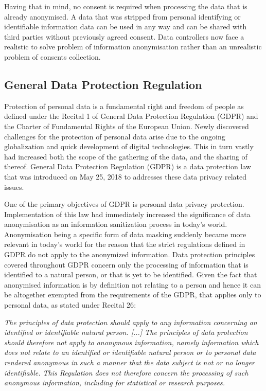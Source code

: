 \documentclass[a4paper,twoside,12pt]{book}
\begin{document}
Having that in mind, no consent is required when processing the data that is already anonymised. A data that was stripped from personal identifying or identifiable information data can be used in any way and can be shared with third parties without previously agreed consent. Data controllers now face a realistic to solve problem of information anonymisation rather than an unrealistic problem of consents collection.\cite{bib:anonymizing_health_data}

\subsection{General Data Protection Regulation}

Protection of personal data is a fundamental right and freedom of people as defined under the Recital 1 of General Data Protection Regulation (GDPR) and the Charter of Fundamental Rights of the European Union.\cite{bib:recital1}\cite{bib:charter} Newly discovered challenges for the protection of personal data arise due to the ongoing globalization and quick development of digital technologies. This in turn vastly had increased both the scope of the gathering of the data, and the sharing of thereof. General Data Protection Regulation (GDPR) is a data protection law that was introduced on May 25, 2018 to addresses these data privacy related issues.\cite{bib:recital6}

One of the primary objectives of GDPR is personal data privacy protection. Implementation of this law had immediately increased the significance of data anonymisation as an information sanitization process in today's world.\cite{bib:anonymization_for_research} Anonymisation being a specific form of data masking suddenly became more relevant in today's world for the reason that the strict regulations defined in GDPR do not apply to the anonymized information. Data protection principles covered throughout GDPR concern only the processing of information that is identified to a natural person, or that is yet to be identified. Given the fact that anonymised information is by definition not relating to a person and hence it can be altogether exempted from the requirements of the GDPR, that applies only to personal data, as stated under Recital 26\cite{bib:recital26}:

\begin{displayquote}
	\textit{The principles of data protection should apply to any information concerning an identified or identifiable natural person. [...] The principles of data protection should therefore not apply to anonymous information, namely information which does not relate to an identified or identifiable natural person or to personal data rendered anonymous in such a manner that the data subject is not or no longer identifiable. This Regulation does not therefore concern the processing of such anonymous information, including for statistical or research purposes.}
\end{displayquote}
\end{document}

